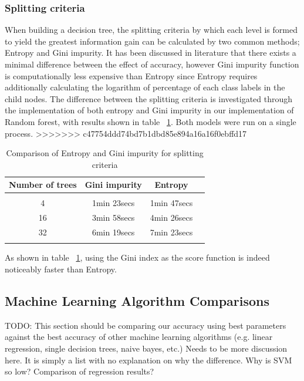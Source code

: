 \documentclass{article} %
\begin{document}
\subsubsection{Splitting criteria}

When building a decision tree, the splitting criteria by which each level is formed to yield the greatest information gain can be calculated by two common methods; Entropy and Gini impurity. It has been discussed in literature that there exists a minimal difference between the effect of accuracy, however Gini impurity function is computationally less expensive than Entropy since Entropy requires additionally calculating the logarithm of percentage of each class labels in the child nodes. The difference between the splitting criteria is investigated through the implementation of both entropy and Gini impurity in our implementation of Random forest, with results shown in table ~\ref{ent-gini}. Both models were run on a single process.
>>>>>>> c47754ddd74bd7b1dbd85e894a16a16f0ebffd17

\begin{table}[h]
\caption{Comparison of Entropy and Gini impurity for splitting criteria}
\begin{center}
\begin{tabular}{cccc}
{\bf Number of trees} &{\bf Gini impurity} &{\bf Entropy}
\\ \hline \\
4	&1min 23secs    &1min 47secs\\
16	&3min 58secs    &4min 26secs\\
32	&6min 19secs    &7min 23secs\\
\label{ent-gini}
\end{tabular}
\end{center}
\end{table}

As shown in table ~\ref{ent-gini}, using the Gini index as the score function is indeed noticeably faster than Entropy.


\subsection{Machine Learning Algorithm Comparisons}
TODO:  This section should be comparing our accuracy using best parameters against the best accuracy of other machine learning algorithms (e.g. linear regression, single decision trees, naive bayes, etc.)
Needs to be more discussion here. It is simply a list with no explanation on why the difference. Why is SVM so low? Comparison of regression results?
\end{document}
